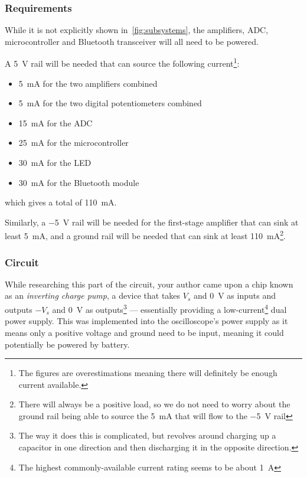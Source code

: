 \subsubsection*{Requirements}

While it is not explicitly shown in~\cref{fig:subsystems}, the amplifiers, ADC,
microcontroller and Bluetooth transceiver will all need to be powered.

A \SI{5}{\V} rail will be needed that can source the following
current\footnote{The figures are overestimations meaning there will
definitely be enough current available.}:
\begin{itemize}
  \item \SI{5}{\mA} for the two amplifiers combined
  \item \SI{5}{\mA} for the two digital potentiometers combined
  \item \SI{15}{\mA} for the ADC
  \item \SI{25}{\mA} for the microcontroller
  \item \SI{30}{\mA} for the LED
  \item \SI{30}{\mA} for the Bluetooth module
\end{itemize}
which gives a total of \SI{110}{\mA}.

Similarly, a \SI{-5}{\V} rail will be needed for the first-stage amplifier that
can sink at least \SI{5}{\mA}, and a ground rail will be needed that can sink
at least \SI{110}{\mA}\footnote{There will always be a positive load, so we do
  not need to worry about the ground rail being able to source the \SI{5}{\mA}
that will flow to the \SI{-5}{\V} rail}.

\subsubsection*{Circuit}

While researching this part of the circuit, your author came upon a chip known
as an \textit{inverting charge pump}, a device that takes $V_s$ and \SI{0}{\V}
as inputs and outputs $-V_s$ and \SI{0}{\V} as outputs\footnote{The way it does
this is complicated, but revolves around charging up a capacitor in one
direction and then discharging it in the opposite direction.} --- essentially
providing a low-current\footnote{The highest commonly-available current rating
seems to be about \SI{1}{\A}} dual power supply. This was implemented into the
oscilloscope's power supply as it means only a positive voltage and ground need
to be input, meaning it could potentially be powered by battery.

